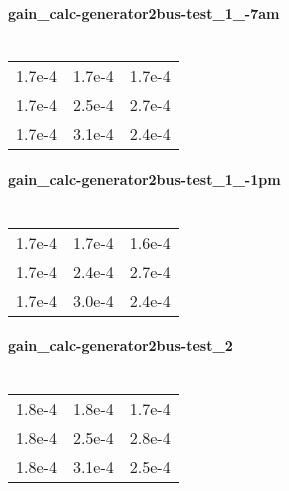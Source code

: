 \documentclass[a4paper,twoside]{article}
\begin{document}
\paragraph{gain\_calc-generator2bus-test\_1\_-7am\\\\}

\begin{tabular}{ccc}
	1.7e-4&1.7e-4&1.7e-4\\
	1.7e-4&2.5e-4&2.7e-4\\
	1.7e-4&3.1e-4&2.4e-4\\
\end{tabular}

\paragraph{gain\_calc-generator2bus-test\_1\_-1pm\\\\}


\begin{tabular}{ccc}
	1.7e-4&1.7e-4&1.6e-4\\
	1.7e-4&2.4e-4&2.7e-4\\
	1.7e-4&3.0e-4&2.4e-4\\
\end{tabular}


\paragraph{gain\_calc-generator2bus-test\_2\\\\}
\begin{tabular}{ccc}

1.8e-4&1.8e-4&1.7e-4\\

1.8e-4&2.5e-4&2.8e-4\\

1.8e-4&3.1e-4&2.5e-4\\
\end{tabular}



\end{document}
